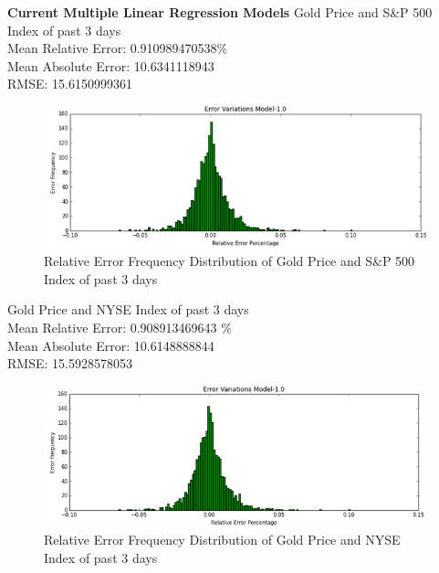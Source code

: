 \documentclass[runningheads]{llncs}
\begin{document}
\noindent\textbf{Current Multiple Linear Regression Models}
\noindent Gold Price and S\&P 500 Index of past 3 days \\
Mean Relative Error: 0.910989470538\% \\
Mean Absolute Error:  10.6341118943 \\
RMSE: 15.6150999361 \\
\begin{figure}
\centering
\includegraphics[width=\textwidth]{GoldSP500_Daily.png}
\caption{Relative Error Frequency Distribution of Gold Price and S\&P 500 Index of past 3 days }
\label{fig:GoldSP500_Daily.png}
\end{figure}

\noindent Gold Price and NYSE Index of past 3 days \\
Mean Relative Error: 0.908913469643 \% \\
Mean Absolute Error:  10.6148888844 \\
RMSE: 15.5928578053 \\
\begin{figure}
\centering
\includegraphics[width=\textwidth]{GoldNYSE_Daily.png}
\caption{Relative Error Frequency Distribution of Gold Price and NYSE Index of past 3 days}
\label{fig:GoldNYSE_Daily.png}
\end{figure}
\end{document}
